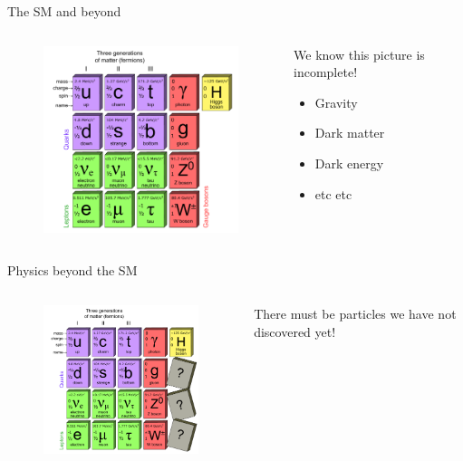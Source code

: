 \documentclass[professionalfont,fleqn]{beamer}
\begin{document}
\begin{frame}{The SM and beyond}
  \begin{columns}
    \begin{column}{.6\linewidth}
      \begin{figure}
    \includegraphics[width=7cm]{figures/sm}
      \end{figure}
    \end{column}
    \begin{column}{.4\linewidth}
      We know this picture is incomplete!
      \begin{itemize}
        \item Gravity
        \item Dark matter
        \item Dark energy
        \item etc etc
      \end{itemize}
    \end{column}
  \end{columns}
\end{frame}

\begin{frame}{Physics beyond the SM}
  \addtocounter{framenumber}{-1}
  \begin{columns}
    \begin{column}{.6\linewidth}
      \begin{figure}
        \includegraphics[width=7cm]{figures/sm-np}
      \end{figure}
    \end{column}
    \begin{column}{.4\linewidth}
      There must be particles we have not discovered yet!
    \end{column}
  \end{columns}
\end{frame}
\end{document}
